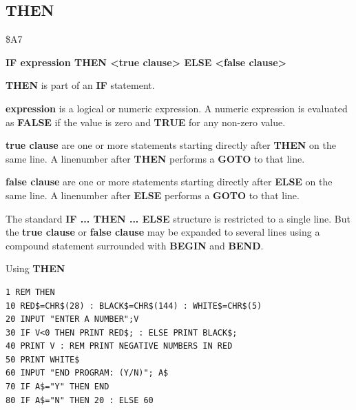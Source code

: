 \subsection{THEN}
\begin{description}[leftmargin=2cm,style=nextline]
\item [Token:] \$A7
\item [Format:] {\bf IF expression THEN <true clause> ELSE <false clause>}
\item [Usage:] {\bf THEN} is part of an {\bf IF} statement.

               {\bf expression} is a logical or numeric expression.
               A numeric expression is evaluated as {\bf FALSE}
               if the value is zero and {\bf TRUE} for any non-zero
               value.

               {\bf true clause} are one or more statements starting
               directly after {\bf THEN} on the same line.
               A linenumber after {\bf THEN} performs a
               {\bf GOTO} to that line.

               {\bf false clause} are one or more statements starting
               directly after {\bf ELSE} on the same line.
               A linenumber after {\bf ELSE} performs a
               {\bf GOTO} to that line.

\item [Remarks:]
               The standard {\bf IF ... THEN ... ELSE} structure
               is restricted to a single line. But the {\bf true clause}
               or {\bf false clause} may be expanded to several lines
               using a compound statement surrounded with
               {\bf BEGIN} and {\bf BEND}.
\item [Example:]
                Using {\bf THEN}
\begin{tcolorbox}[colback=black,coltext=white]
\verbatimfont{\codefont}
\begin{verbatim}
1 REM THEN
10 RED$=CHR$(28) : BLACK$=CHR$(144) : WHITE$=CHR$(5)
20 INPUT "ENTER A NUMBER";V
30 IF V<0 THEN PRINT RED$; : ELSE PRINT BLACK$;
40 PRINT V : REM PRINT NEGATIVE NUMBERS IN RED
50 PRINT WHITE$
60 INPUT "END PROGRAM: (Y/N)"; A$
70 IF A$="Y" THEN END
80 IF A$="N" THEN 20 : ELSE 60
\end{verbatim}
\end{tcolorbox}
\end{description}


